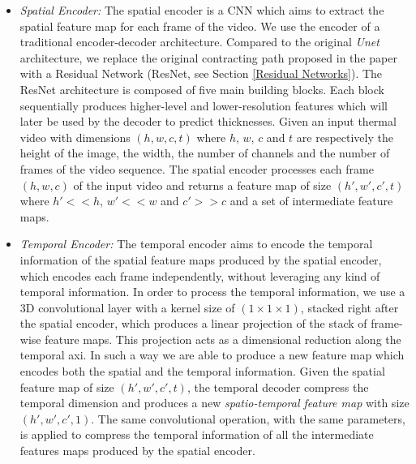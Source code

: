 \begin{itemize}
    \item \textit{Spatial Encoder:} The spatial encoder is a CNN which aims to extract the spatial feature map for each frame of the video. 
    We use the encoder of a traditional encoder-decoder architecture. Compared to the original \textit{Unet} architecture, we replace the original contracting path proposed in the paper with a Residual Network (ResNet, see Section \ref{Residual Networks}). The ResNet architecture is composed of five main building blocks. Each block sequentially produces higher-level and lower-resolution features which will later be used by the decoder to predict thicknesses. Given an input thermal video with dimensions $(h, w, c, t)$ where $h$, $w$, $c$ and $t$ are respectively the height of the image, the width, the number of channels and the number of frames of the video sequence. The spatial encoder processes each frame $(h, w, c)$ of the input video and  returns a feature map of size $(h', w', c', t)$ where $h'<<h$, $w'<<w$ and $c'>>c$ and a set of intermediate feature maps.

    \item \textit{Temporal Encoder:} The temporal encoder aims to encode the temporal information of the spatial feature maps produced by the spatial encoder, which encodes each frame independently, without leveraging any kind of temporal information. In order to process the temporal information, we use a 3D convolutional layer with a kernel size of $(1\times1\times1)$, stacked right after the spatial encoder, which produces a linear projection of the stack of frame-wise feature maps. This projection acts as a dimensional reduction along the temporal axi. In such a way we are able to produce a new feature map which encodes both the spatial and the temporal information. Given the spatial feature map of size $(h', w', c', t)$, the temporal decoder compress the temporal dimension and produces a new \textit{spatio-temporal feature map} with size $(h', w', c', 1)$.  The same convolutional operation, with the same parameters, is applied to compress the temporal information of all the intermediate features maps produced by the spatial encoder.
    

\end{itemize}

